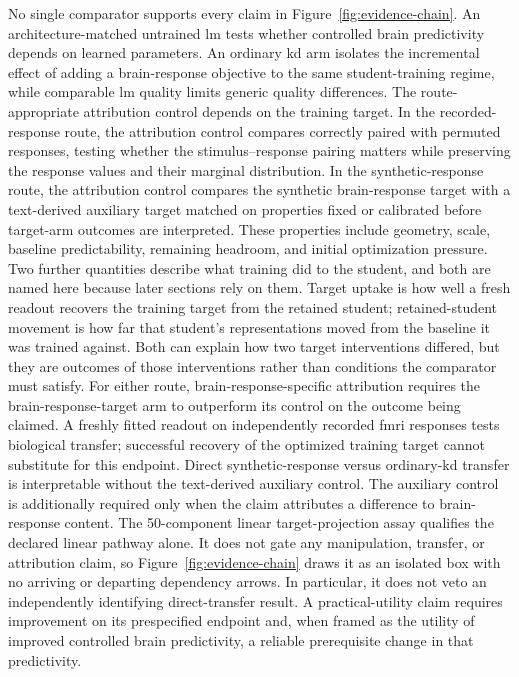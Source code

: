 No single comparator supports every claim in Figure~\ref{fig:evidence-chain}.
An architecture-matched untrained \ac{lm} tests whether controlled brain predictivity depends on learned parameters.
An ordinary \ac{kd} arm isolates the incremental effect of adding a brain-response objective to the same student-training regime, while comparable \ac{lm} quality limits generic quality differences.
The route-appropriate attribution control depends on the training target.
In the recorded-response route, the attribution control compares correctly paired with permuted responses, testing whether the stimulus--response pairing matters while preserving the response values and their marginal distribution.
In the synthetic-response route, the attribution control compares the synthetic brain-response target with a text-derived auxiliary target matched on properties fixed or calibrated before target-arm outcomes are interpreted.
These properties include geometry, scale, baseline predictability, remaining headroom, and initial optimization pressure.
Two further quantities describe what training did to the student, and both are named here because later sections rely on them.
Target uptake is how well a fresh readout recovers the training target from the retained student; retained-student movement is how far that student's representations moved from the baseline it was trained against.
Both can explain how two target interventions differed, but they are outcomes of those interventions rather than conditions the comparator must satisfy.
For either route, brain-response-specific attribution requires the brain-response-target arm to outperform its control on the outcome being claimed.
A freshly fitted readout on independently recorded \ac{fmri} responses tests biological transfer; successful recovery of the optimized training target cannot substitute for this endpoint.
Direct synthetic-response versus ordinary-\ac{kd} transfer is interpretable without the text-derived auxiliary control.
The auxiliary control is additionally required only when the claim attributes a difference to brain-response content.
The 50-component linear target-projection assay qualifies the declared linear pathway alone.
It does not gate any manipulation, transfer, or attribution claim, so Figure~\ref{fig:evidence-chain} draws it as an isolated box with no arriving or departing dependency arrows.
In particular, it does not veto an independently identifying direct-transfer result.
A practical-utility claim requires improvement on its prespecified endpoint and, when framed as the utility of improved controlled brain predictivity, a reliable prerequisite change in that predictivity.

